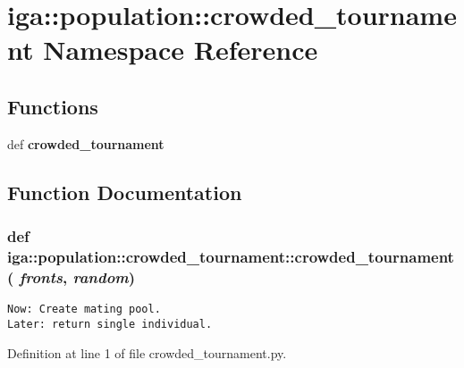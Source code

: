 \section{iga::population::crowded\_\-tournament Namespace Reference}
\label{namespaceiga_1_1population_1_1crowded__tournament}


\subsection*{Functions}
\begin{CompactItemize}
\item 
def {\bf crowded\_\-tournament}
\end{CompactItemize}


\subsection{Function Documentation}
\subsubsection{\setlength{\rightskip}{0pt plus 5cm}def iga::population::crowded\_\-tournament::crowded\_\-tournament ( {\em fronts},  {\em random})}\label{namespaceiga_1_1population_1_1crowded__tournament_1dffa916f03cb541ad7304becdb86acf}




\footnotesize\begin{verbatim}
Now: Create mating pool.
Later: return single individual.
\end{verbatim}
\normalsize
 

Definition at line 1 of file crowded\_\-tournament.py.